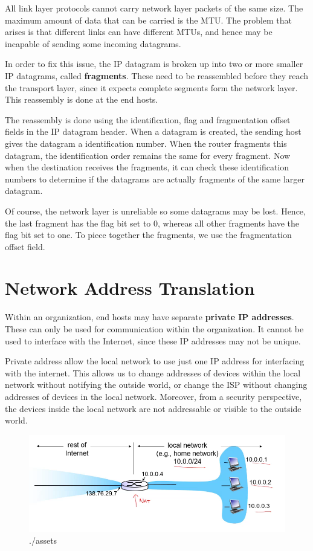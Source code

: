 \documentclass[12pt,letterpaper]{book}
\theoremstyle{definition}
\begin{document}
All link layer protocols cannot carry network layer packets of the same size. The maximum amount of data that can be carried is the MTU. The problem that arises is that different links can have different MTUs, and hence may be incapable of sending some incoming datagrams.

In order to fix this issue, the IP datagram is broken up into two or more smaller IP datagrams, called \textbf{fragments}. These need to be reassembled before they reach the transport layer, since it expects complete segments form the network layer. This reassembly is done at the end hosts.

The reassembly is done using the identification, flag and fragmentation offset fields in the IP datagram header. When a datagram is created, the sending host gives the datagram a identification number. When the router fragments this datagram, the identification order remains the same for every fragment. Now when the destination receives the fragments, it can check these identification numbers to determine if the datagrams are actually fragments of the same larger datagram.

Of course, the network layer is unreliable so some datagrams may be lost. Hence, the last fragment has the flag bit set to 0, whereas all other fragments have the flag bit set to one. To piece together the fragments, we use the fragmentation offset field.

\section{Network Address Translation}

Within an organization, end hosts may have separate \textbf{private IP addresses}. These can only be used for communication within the organization. It cannot be used to interface with the Internet, since these IP addresses may not be unique.

Private address allow the local network to use just one IP address for interfacing with the internet. This allows us to change addresses of devices within the local network without notifying the outside world, or change the ISP without changing addresses of devices in the local network. Moreover, from a security perspective, the devices inside the local network are not addressable or visible to the outside world.

\begin{figure}[htpb]
  \centering
  \includegraphics[width=0.8\linewidth]{./assets/NAT_eg.png}
  \caption{./assets}%
  \label{fig:./assets}
\end{figure}
\end{document}
